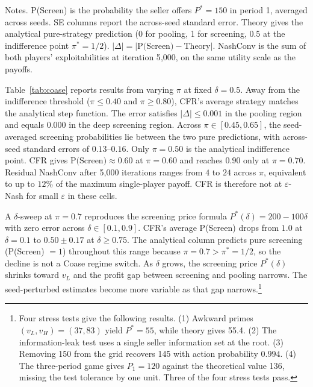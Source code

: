 \begin{table}[htbp]
\centering
\caption{CFR strategy versus the analytical equilibrium in the
$\pi$-sweep at $\delta = 0.5$, with $n = 10$ seeds per cell.}
\label{tab:coase}

\begin{minipage}{0.9\textwidth}
\footnotesize
Notes. P(Screen) is the probability the seller offers $P^* = 150$ in period 1, averaged across seeds. SE columns report the across-seed standard error. Theory gives the analytical pure-strategy prediction (0 for pooling, 1 for screening, 0.5 at the indifference point $\pi^* = 1/2$). $|\Delta| = |\text{P(Screen)} - \text{Theory}|$. NashConv is the sum of both players' exploitabilities at iteration 5{,}000, on the same utility scale as the payoffs.
\end{minipage}
\end{table}

Table~\ref{tab:coase} reports results from varying $\pi$ at fixed
$\delta = 0.5$. Away from the indifference threshold
($\pi \le 0.40$ and $\pi \ge 0.80$), CFR's average strategy matches the
analytical step function. The error satisfies $|\Delta| \le 0.001$ in
the pooling region and equals $0.000$ in the deep screening region.
Across $\pi \in [0.45, 0.65]$, the seed-averaged screening
probabilities lie between the two pure predictions, with across-seed
standard errors of $0.13$--$0.16$. Only $\pi = 0.50$ is the analytical
indifference point. CFR gives $\text{P(Screen)} \approx 0.60$ at
$\pi = 0.60$ and reaches $0.90$ only at $\pi = 0.70$.
Residual NashConv after 5{,}000 iterations ranges from $4$ to $24$
across $\pi$, equivalent to up to $12\%$ of the maximum single-player
payoff. CFR is therefore not at $\varepsilon$-Nash for small
$\varepsilon$ in these cells.

A $\delta$-sweep at $\pi = 0.7$ reproduces the screening price formula
$P^*(\delta) = 200 - 100\delta$ with zero error across
$\delta \in [0.1, 0.9]$. CFR's average P(Screen) drops from $1.0$ at
$\delta = 0.1$ to $0.50 \pm 0.17$ at $\delta \ge 0.75$. The analytical
column predicts pure screening (P(Screen) $= 1$) throughout this range
because $\pi = 0.7 > \pi^* = 1/2$, so the decline is not a Coase regime
switch. As $\delta$ grows, the screening price $P^*(\delta)$ shrinks
toward $v_L$ and the profit gap between screening and pooling narrows.
The seed-perturbed estimates become more variable as that gap
narrows.\footnote{Four stress tests give the following results.
(1) Awkward primes $(v_L, v_H) = (37, 83)$ yield $P^* = 55$, while
theory gives 55.4. (2) The information-leak test uses a single seller
information set at the root. (3) Removing 150 from the grid recovers
145 with action probability $0.994$. (4) The three-period game gives
$P_1 = 120$ against the theoretical value 136, missing the test
tolerance by one unit. Three of the four stress tests pass.}

